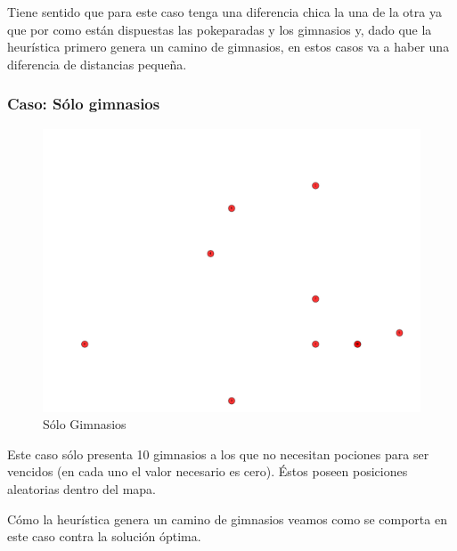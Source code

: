 Tiene sentido que para este caso tenga una diferencia chica la una de la otra ya que por como están dispuestas las pokeparadas y los gimnasios y, dado que la heurística primero genera un camino de gimnasios, en estos casos va a haber una diferencia de distancias pequeña.


\subsubsection{Caso: Sólo gimnasios}

\begin{figure}[H]
  \begin{center}
    \includegraphics[scale=0.4]{imagenes/test3.pdf}
    \caption{Sólo Gimnasios}
    \label{fig:ej2_caso3}
  \end{center}
\end{figure}

Este caso sólo presenta 10 gimnasios a los que no necesitan pociones para ser vencidos (en cada uno el valor necesario es cero). Éstos poseen posiciones aleatorias dentro del mapa.

Cómo la heurística genera un camino de gimnasios veamos como se comporta en este caso contra la solución óptima.

